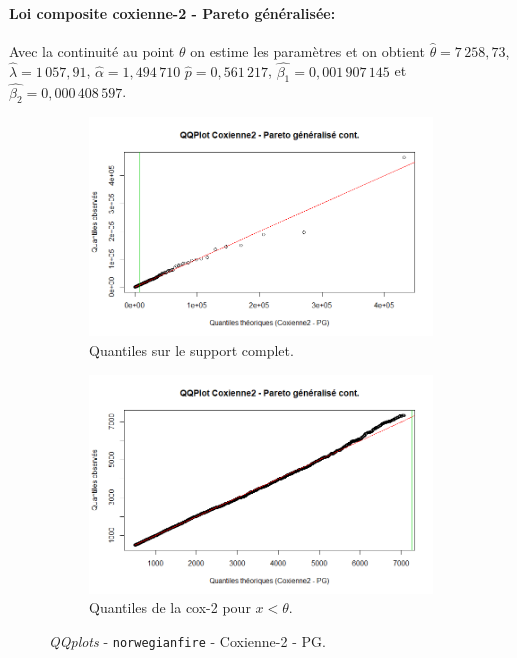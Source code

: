 		\paragraph{Loi composite coxienne-2 - Pareto généralisée:} Avec la continuité au point $\theta$ on estime les paramètres et on obtient $\hat{\theta} =  7\,258,73$, $\hat{\lambda}=1\,057,91$, $\hat{\alpha}= 1,494\,710$ $\hat{p} = 0,561\,217$, $\hat{\beta_1}=0,001\,907\,145$ et $\hat{\beta_2}= 0,000\,408\,597$.
		
		\begin{figure}[H]
			\begin{center}
				\begin{subfigure}[b]{0.45\textwidth}
					\includegraphics[scale=0.40]{Graphiques/QQ_Cox_PG_cont} 
					\caption{Quantiles sur le support complet.} \label{QQplot_Cox_PG_con}
				\end{subfigure}
				\begin{subfigure}[b]{0.4\textwidth}
					\includegraphics[scale=0.40]{Graphiques/QQ_Cox_PG_cont_t1} 
					\caption{Quantiles de la cox-2 pour $x<\theta$.} \label{QQplot_Cox_PG_con_2}
				\end{subfigure}
				\renewcommand{\figurename}{Illustration}
				\caption{\textit{QQplots} - \texttt{norwegianfire} - Coxienne-2 - PG. }
			\end{center}
		\end{figure}
		
